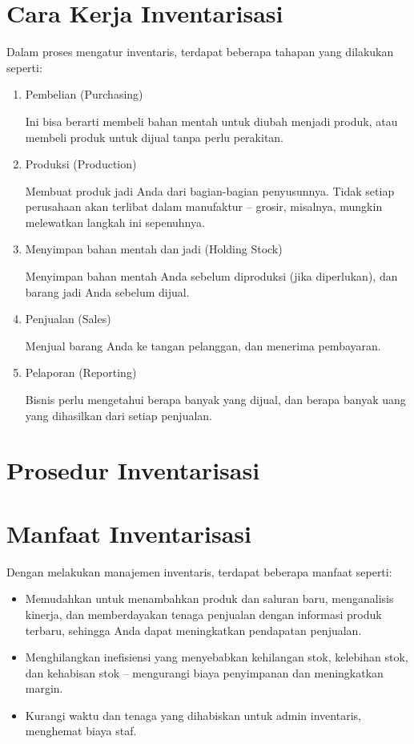 \section{Cara Kerja Inventarisasi}

Dalam proses mengatur inventaris, terdapat beberapa tahapan yang dilakukan seperti:

\begin{enumerate}
    \item Pembelian (Purchasing)
    
    Ini bisa berarti membeli bahan mentah untuk diubah menjadi produk, atau membeli produk untuk dijual tanpa perlu perakitan.

    \item Produksi (Production)
    
    Membuat produk jadi Anda dari bagian-bagian penyusunnya. Tidak setiap perusahaan akan terlibat dalam manufaktur – grosir, misalnya, mungkin melewatkan langkah ini sepenuhnya.

    \item Menyimpan bahan mentah dan jadi (Holding Stock)
    
    Menyimpan bahan mentah Anda sebelum diproduksi (jika diperlukan), dan barang jadi Anda sebelum dijual.

    \item Penjualan (Sales)
    
    Menjual barang Anda ke tangan pelanggan, dan menerima pembayaran.

    \item Pelaporan (Reporting)
    
    Bisnis perlu mengetahui berapa banyak yang dijual, dan berapa banyak uang yang dihasilkan dari setiap penjualan.

\end{enumerate}

\section{Prosedur Inventarisasi}


\section{Manfaat Inventarisasi}

Dengan melakukan manajemen inventaris, terdapat beberapa manfaat seperti:

\begin{itemize}
    \item Memudahkan untuk menambahkan produk dan saluran baru, menganalisis kinerja, dan memberdayakan tenaga penjualan dengan informasi produk terbaru, sehingga Anda dapat meningkatkan pendapatan penjualan.
    \item Menghilangkan inefisiensi yang menyebabkan kehilangan stok, kelebihan stok, dan kehabisan stok – mengurangi biaya penyimpanan dan meningkatkan margin.
    \item Kurangi waktu dan tenaga yang dihabiskan untuk admin inventaris, menghemat biaya staf.
\end{itemize}

